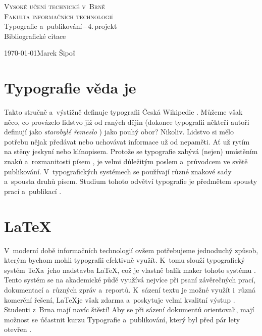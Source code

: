 \documentclass[11pt, a4paper, titlepage]{article}
\begin{document}
    \begin{titlepage}
        \renewcommand{\baselinestretch}{0.5}
        \thispagestyle{empty}
        \begin{center}
            \Huge\textsc{Vysoké učení technické v~Brně}\\\medskip
            \huge\textsc{Fakulta informačních technologií}\\
            \LARGE Typografie a~publikování\,--\,4.\,projekt\\\medskip
            \Huge Bibliografické citace\\
        \end{center}
        \Large \today\hfill Marek Šipoš
    \end{titlepage}
    
    \newpage
    \setcounter{page}{1}
    
    \section{Typografie věda je}
    {\em{}} Takto stručně a~výstižně definuje typografii Česká Wikipedie \cite{Wikipedia:Typografie}.
    Můžeme však něco, co provázelo lidstvo již od raných dějin (dokonce typografii někteří autoři definují jako {\em starobylé řemeslo} \cite{Bringhurst:The_Elements_of_Typographic_Style})  jako pouhý obor? Nikoliv. Lidstvo si mělo potřebu nějak předávat nebo uchovávat informace už od nepaměti. Ať už rytím na stěny jeskyní nebo klínopisem.
    Protože se typografie zabývá (nejen) umístěním znaků a~rozmanitosti písem \cite{Ambrose:Typografie_graficky_design}, je velmi důležitým poslem a~průvodcem ve světě publikování. V~typografických systémech se používají různé znakové sady a~spousta druhů písem. Studium tohoto odvětví typografie je předmětem spousty prací a~publikací \cite{Cerny:Znakove_sady_v_typografickych_systemech}.
    \section{\LaTeX}
    V~moderní době informačních technologií ovšem potřebujeme jednoduchý způsob, kterým bychom mohli typografii efektivně využít. K~tomu slouží typografický systém \TeX\space a~jeho nadstavba \LaTeX, což je vlastně balík maker tohoto systému \cite{Wikibooks:LaTeX}.
    Tento systém se na akademické půdě využívá nejvíce při psaní závěrečných prací, dokumentací a~různých zpráv a~reportů. K~sázení textu je možné využít i~různá komerční řešení, \LaTeX\space je však zdarma a~poskytuje velmi kvalitní výstup \cite{FEKT:LaTeX}. Studenti z~Brna mají navíc štěstí! Aby se při sázení dokumentů orientovali, mají možnost se účastnit kurzu Typografie a~publikování, který byl před pár lety otevřen \cite{Krena:Zavedeni_predmetu_typografie_a_publikovani}. 
\end{document}
